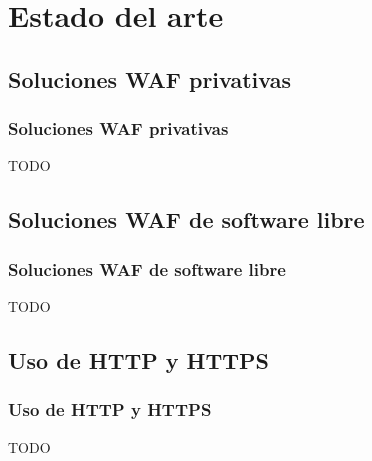 \section{Estado del arte}
\subsection{Soluciones WAF privativas}
\begin{frame}[shrink]
  \frametitle{Soluciones WAF privativas}
  TODO
\end{frame}

\subsection{Soluciones WAF de software libre}
\begin{frame}[shrink]
  \frametitle{Soluciones WAF de software libre}
  TODO
\end{frame}

\subsection{Uso de HTTP y HTTPS}
\begin{frame}[shrink]
  \frametitle{Uso de HTTP y HTTPS}
  TODO
\end{frame}
